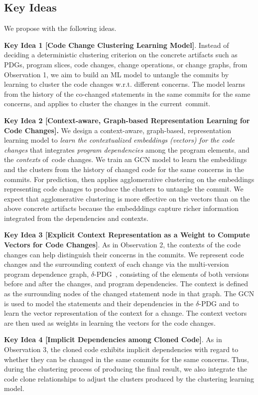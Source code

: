 \subsection{Key Ideas}
\label{ideas:sec}

We propose {\tool} with the following ideas.


{\bf Key Idea 1 [Code Change Clustering Learning Model]}. Instead of
deciding a deterministic clustering criterion on the concrete
artifacts such as PDGs, program slices, code changes, change
operations, or change graphs, from Observation 1, we aim to build an
ML model to untangle the commits by learning to cluster the code
changes w.r.t. different concerns. The model learns from the
history of the co-changed statements in the same commits for the same
concerns, and applies to cluster the changes in the current~commit.

{\bf Key Idea 2 [Context-aware, Graph-based Representation Learning
    for Code Changes].} We design a context-aware, graph-based,
representation learning model to {\em learn the contextualized
  embeddings (vectors) for the code changes} that integrates {\em
  program dependencies} among the program elements, and the {\em
  contexts} of~code changes. We train an GCN model to learn the
embeddings and the clusters from the history of changed code for the
same concerns in the commits. For prediction, {\tool} then applies
agglomerative clustering on the embeddings representing code changes
to produce the clusters to untangle the commit. We expect that
agglomerative clustering is more effective on the vectors than on
the above concrete artifacts because the embedddings capture richer
information integrated from the dependencies and contexts.


{\bf Key Idea 3 [Explicit Context Representation as a Weight to
    Compute Vectors for Code Changes]}. As in Observation 2, the
contexts of the code changes can help distinguish their
concerns in the commits. We represent code changes and the
surrounding context of each change via the multi-version program
dependence graph, $\delta$-PDG~\cite{flexeme-fse20}, consisting of the
elements of both versions before and after the changes, and 
program dependencies. The context is defined as the surrounding nodes
of the changed statement node in that graph. The GCN is used to
model the statements and their dependencies in the $\delta$-PDG and to
learn the vector representation of the context for a change. The
context vectors are then used as weights in learning the vectors for the
code changes.

{\bf Key Idea 4 [Implicit Dependencies among Cloned Code]}. As in
Observation 3, the cloned code exhibits implicit dependencies with
regard to whether they can be changed in the same commits for the same
concerns. Thus, during the clustering process of producing the final
result, we also integrate the code clone relationships to
adjust the clusters produced by the clustering learning model.


